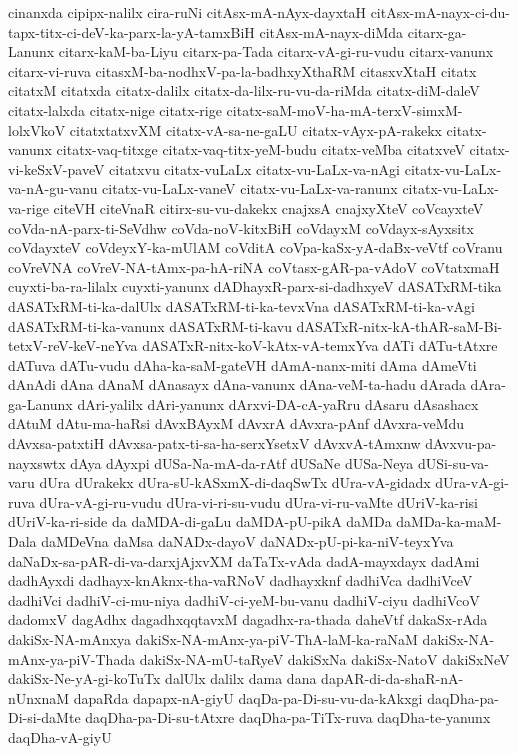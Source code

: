 {cinanxda
cipipx-nalilx
cira-ruNi
citAsx-mA-nAyx-dayxtaH
citAsx-mA-nayx-ci-du-tapx-titx-ci-deV-ka-parx-la-yA-tamxBiH
citAsx-mA-nayx-diMda
citarx-ga-Lanunx
citarx-kaM-ba-Liyu
citarx-pa-Tada
citarx-vA-gi-ru-vudu
citarx-vanunx
citarx-vi-ruva
citasxM-ba-nodhxV-pa-la-badhxyXthaRM
citasxvXtaH
citatx
citatxM
citatxda
citatx-dalilx
citatx-da-lilx-ru-vu-da-riMda
citatx-diM-daleV
citatx-lalxda
citatx-nige
citatx-rige
citatx-saM-moV-ha-mA-terxV-simxM-lolxVkoV
citatxtatxvXM
citatx-vA-sa-ne-gaLU
citatx-vAyx-pA-rakekx
citatx-vanunx
citatx-vaq-titxge
citatx-vaq-titx-yeM-budu
citatx-veMba
citatxveV
citatx-vi-keSxV-paveV
citatxvu
citatx-vuLaLx
citatx-vu-LaLx-va-nAgi
citatx-vu-LaLx-va-nA-gu-vanu
citatx-vu-LaLx-vaneV
citatx-vu-LaLx-va-ranunx
citatx-vu-LaLx-va-rige
citeVH
citeVnaR
citirx-su-vu-dakekx
cnajxsA
cnajxyXteV
coVcayxteV
coVda-nA-parx-ti-SeVdhw
coVda-noV-kitxBiH
coVdayxM
coVdayx-sAyxsitx
coVdayxteV
coVdeyxY-ka-mUlAM
coVditA
coVpa-kaSx-yA-daBx-veVtf
coVranu
coVreVNA
coVreV-NA-tAmx-pa-hA-riNA
coVtasx-gAR-pa-vAdoV
coVtatxmaH
cuyxti-ba-ra-lilalx
cuyxti-yanunx
dADhayxR-parx-si-dadhxyeV
dASATxRM-tika
dASATxRM-ti-ka-dalUlx
dASATxRM-ti-ka-tevxVna
dASATxRM-ti-ka-vAgi
dASATxRM-ti-ka-vanunx
dASATxRM-ti-kavu
dASATxR-nitx-kA-thAR-saM-Bi-tetxV-reV-keV-neYva
dASATxR-nitx-koV-kAtx-vA-temxYva
dATi
dATu-tAtxre
dATuva
dATu-vudu
dAha-ka-saM-gateVH
dAmA-nanx-miti
dAma
dAmeVti
dAnAdi
dAna
dAnaM
dAnasayx
dAna-vanunx
dAna-veM-ta-hadu
dArada
dAra-ga-Lanunx
dAri-yalilx
dAri-yanunx
dArxvi-DA-cA-yaRru
dAsaru
dAsashacx
dAtuM
dAtu-ma-haRsi
dAvxBAyxM
dAvxrA
dAvxra-pAnf
dAvxra-veMdu
dAvxsa-patxtiH
dAvxsa-patx-ti-sa-ha-serxYsetxV
dAvxvA-tAmxnw
dAvxvu-pa-nayxswtx
dAya
dAyxpi
dUSa-Na-mA-da-rAtf
dUSaNe
dUSa-Neya
dUSi-su-va-varu
dUra
dUrakekx
dUra-sU-kASxmX-di-daqSwTx
dUra-vA-gidadx
dUra-vA-gi-ruva
dUra-vA-gi-ru-vudu
dUra-vi-ri-su-vudu
dUra-vi-ru-vaMte
dUriV-ka-risi
dUriV-ka-ri-side
da
daMDA-di-gaLu
daMDA-pU-pikA
daMDa
daMDa-ka-maM-Dala
daMDeVna
daMsa
daNADx-dayoV
daNADx-pU-pi-ka-niV-teyxYva
daNaDx-sa-pAR-di-va-darxjAjxvXM
daTaTx-vAda
dadA-mayxdayx
dadAmi
dadhAyxdi
dadhayx-knAknx-tha-vaRNoV
dadhayxknf
dadhiVca
dadhiVceV
dadhiVci
dadhiV-ci-mu-niya
dadhiV-ci-yeM-bu-vanu
dadhiV-ciyu
dadhiVcoV
dadomxV
dagAdhx
dagadhxqqtavxM
dagadhx-ra-thada
daheVtf
dakaSx-rAda
dakiSx-NA-mAnxya
dakiSx-NA-mAnx-ya-piV-ThA-laM-ka-raNaM
dakiSx-NA-mAnx-ya-piV-Thada
dakiSx-NA-mU-taRyeV
dakiSxNa
dakiSx-NatoV
dakiSxNeV
dakiSx-Ne-yA-gi-koTuTx
dalUlx
dalilx
dama
dana
dapAR-di-da-shaR-nA-nUnxnaM
dapaRda
dapapx-nA-giyU
daqDa-pa-Di-su-vu-da-kAkxgi
daqDha-pa-Di-si-daMte
daqDha-pa-Di-su-tAtxre
daqDha-pa-TiTx-ruva
daqDha-te-yanunx
daqDha-vA-giyU
}
